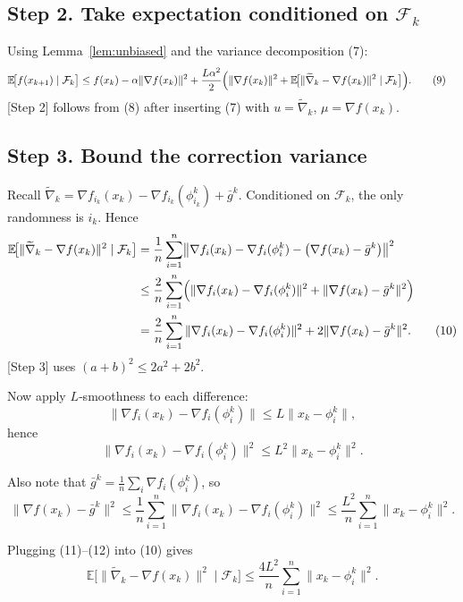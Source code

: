 \documentclass{article}
\newcommand{\E}{\mathbb{E}}
\begin{document}
\subsection*{Step 2. Take expectation conditioned on $\mathcal{F}_k$}
Using Lemma~\ref{lem:unbiased} and the variance decomposition (7):
\begin{align}
\E\!\bigl[f(x_{k+1})\mid\mathcal{F}_k\bigr]
&\le f(x_k)-\alpha\|\nabla f(x_k)\|^{2}
   +\frac{L\alpha^{2}}{2}\Bigl(\|\nabla f(x_k)\|^{2}
   +\E\!\bigl[\|\widetilde{\nabla}_k-\nabla f(x_k)\|^{2}\mid\mathcal{F}_k\bigr]\Bigr). \tag{9}
\end{align}
[Step 2] follows from (8) after inserting (7) with $u=\widetilde{\nabla}_k$, $\mu=\nabla f(x_k)$.

\subsection*{Step 3. Bound the correction variance}
Recall $\widetilde{\nabla}_k = \nabla f_{i_k}(x_k)-\nabla f_{i_k}(\phi_{i_k}^{k})+\bar g^{k}$.
Conditioned on $\mathcal{F}_k$, the only randomness is $i_k$. Hence
\begin{align}
\E\!\bigl[\|\widetilde{\nabla}_k-\nabla f(x_k)\|^{2}\mid\mathcal{F}_k\bigr]
&= \frac{1}{n}\sum_{i=1}^{n}
   \bigl\|\nabla f_i(x_k)-\nabla f_i(\phi_i^{k})-\bigl(\nabla f(x_k)-\bar g^{k}\bigr)\bigr\|^{2} \nonumber\\
&\le \frac{2}{n}\sum_{i=1}^{n}
   \Bigl(\|\nabla f_i(x_k)-\nabla f_i(\phi_i^{k})\|^{2}
   +\|\nabla f(x_k)-\bar g^{k}\|^{2}\Bigr) \nonumber\\
&= \frac{2}{n}\sum_{i=1}^{n}\|\nabla f_i(x_k)-\nabla f_i(\phi_i^{k})\|^{2}
   +2\|\nabla f(x_k)-\bar g^{k}\|^{2}. \tag{10}
\end{align}
[Step 3] uses $(a+b)^{2}\le2a^{2}+2b^{2}$.

Now apply $L$‑smoothness to each difference:
\[
\|\nabla f_i(x_k)-\nabla f_i(\phi_i^{k})\|
\le L\|x_k-\phi_i^{k}\|,
\]
hence
\[
\|\nabla f_i(x_k)-\nabla f_i(\phi_i^{k})\|^{2}
\le L^{2}\|x_k-\phi_i^{k}\|^{2}. \tag{11}
\]

Also note that $\bar g^{k}= \frac{1}{n}\sum_{i}\nabla f_i(\phi_i^{k})$, so
\[
\|\nabla f(x_k)-\bar g^{k}\|^{2}
\le \frac{1}{n}\sum_{i=1}^{n}\|\nabla f_i(x_k)-\nabla f_i(\phi_i^{k})\|^{2}
\le \frac{L^{2}}{n}\sum_{i=1}^{n}\|x_k-\phi_i^{k}\|^{2}. \tag{12}
\]

Plugging (11)–(12) into (10) gives
\[
\E\!\bigl[\|\widetilde{\nabla}_k-\nabla f(x_k)\|^{2}\mid\mathcal{F}_k\bigr]
\le \frac{4L^{2}}{n}\sum_{i=1}^{n}\|x_k-\phi_i^{k}\|^{2}. \tag{13}
\]
\end{document}

